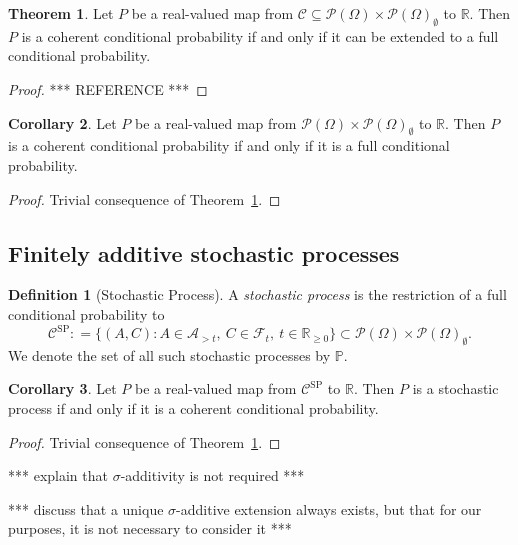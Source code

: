 \documentclass[10pt]{paper}
\theoremstyle{definition}
\newtheorem{theorem}{Theorem}
\newtheorem{corollary}[theorem]{Corollary}
\newtheorem{definition}{Definition}
\newcommand{\reals}{\mathbb{R}}
\newcommand{\realsnonneg}{\reals_{\geq 0}}
\newcommand{\paths}{\Omega}
\newcommand{\power}{\mathcal{P}(\paths)}
\newcommand{\nonemptypower}{\power_{\emptyset}}
\newcommand{\filter}[1][t]{\mathcal{F}_{#1}}
\newcommand{\processes}{\mathbb{P}}
\newcommand{\coloneqq}{:\!=}
\begin{document}
\begin{theorem}\label{theo:coherentextendable}
Let $P$ be a real-valued map from $\mathcal{C}\subseteq\power\times\nonemptypower$ to $\reals$. Then $P$ is a coherent conditional probability if and only if it can be extended to a full conditional probability.
\end{theorem}
\begin{proof}
*** REFERENCE ***
\end{proof}

\begin{corollary}
Let $P$ be a real-valued map from $\power\times\nonemptypower$ to $\reals$. Then $P$ is a coherent conditional probability if and only if it is a full conditional probability.
\end{corollary}
\begin{proof}
Trivial consequence of Theorem~\ref{theo:coherentextendable}.
\end{proof}

\subsection{Finitely additive stochastic processes}


\begin{definition}[Stochastic Process]\label{def:stoch_process}
A \emph{stochastic process} is the restriction of a full conditional probability to
\begin{equation*}
\mathcal{C}^\mathrm{SP}\coloneqq\big\{
(A,C)
\colon
A\in\mathcal{A}_{> t},~C\in\filter,~t\in\realsnonneg\big\}\subset\power\times\nonemptypower.
\end{equation*}
We denote the set of all such stochastic processes by $\processes$.
\end{definition}

\begin{corollary}
Let $P$ be a real-valued map from $\mathcal{C}^\mathrm{SP}$ to $\reals$. Then $P$ is a stochastic process if and only if it is a coherent conditional probability.
\end{corollary}
\begin{proof}
Trivial consequence of Theorem~\ref{theo:coherentextendable}.
\end{proof}

*** explain that $\sigma$-additivity is not required ***

*** discuss that a unique $\sigma$-additive extension always exists, but that for our purposes, it is not necessary to consider it ***
\end{document}
